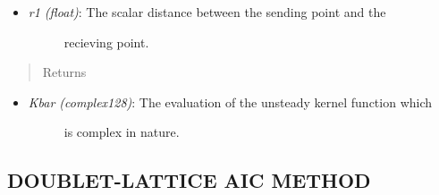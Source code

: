 \documentclass[letterpaper,10pt,english]{sphinxmanual}
\begin{document}
\begin{fulllineitems}
\begin{itemize}
\item {} \begin{description}
\item[{\emph{r1 (float)}: The scalar distance between the sending point and the}] \leavevmode
recieving point.

\end{description}

\end{itemize}
\begin{quote}\begin{description}
\item[{Returns}] \leavevmode
\end{description}\end{quote}
\begin{itemize}
\item {} \begin{description}
\item[{\emph{Kbar (complex128)}: The evaluation of the unsteady kernel function which}] \leavevmode
is complex in nature.

\end{description}

\end{itemize}

\end{fulllineitems}



\subsection{DOUBLET-LATTICE AIC METHOD}
\label{aerodynamics:doublet-lattice-aic-method}
\end{document}
